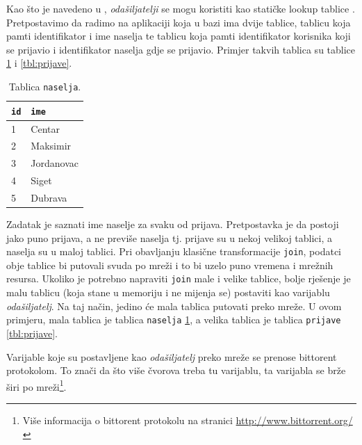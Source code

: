 \documentclass[times, utf8, zavrsni, numeric]{fer}
\begin{document}
Kao što je navedeno u \cite{officialDocumentation}, \emph{odašiljatelji} se mogu koristiti kao statičke lookup tablice . 
Pretpostavimo da radimo na aplikaciji koja u bazi ima dvije tablice, tablicu koja pamti identifikator i ime naselja te tablicu koja pamti identifikator korisnika koji se prijavio i identifikator naselja gdje se prijavio. Primjer takvih tablica su tablice \ref{tbl:naselja} i \ref{tbl:prijave}.

\begin{table}[htb]
\caption{Tablica \texttt{naselja}.}
\label{tbl:naselja}
\centering
\begin{tabular}{ll} 
\hline
\texttt{id} & \texttt{ime}\\
\hline
1 & Centar\\
2 & Maksimir\\
3 & Jordanovac\\
4 & Siget\\
5 & Dubrava\\
\hline
\end{tabular}
\end{table}

Zadatak je saznati ime naselje za svaku od prijava. Pretpostavka je da postoji jako puno prijava, a ne previše naselja tj. prijave su u nekoj velikoj tablici, a naselja su u maloj tablici. Pri obavljanju klasične transformacije \texttt{join}, podatci obje tablice bi putovali svuda po mreži i to bi uzelo puno vremena i mrežnih resursa. Ukoliko je potrebno napraviti \texttt{join} male i velike tablice, bolje rješenje je malu tablicu (koja stane u memoriju i ne mijenja se) postaviti kao varijablu \emph{odašiljatelj}. Na taj način, jedino će mala tablica putovati preko mreže. U ovom primjeru, mala tablica je tablica \texttt{naselja} \ref{tbl:naselja}, a velika tablica je tablica \texttt{prijave} \ref{tbl:prijave}. 

Varijable koje su postavljene kao \emph{odašiljatelj} preko mreže se prenose bittorent protokolom. To znači da što više čvorova treba tu varijablu, ta varijabla se brže širi po mreži\footnote{Više informacija o bittorent protokolu na stranici \url{http://www.bittorrent.org/}}. 
\end{document}
